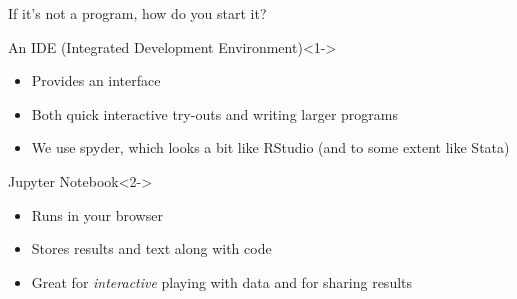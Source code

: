 \documentclass{beamer}
\begin{document}
\begin{frame}{If it's not a program, how do you start it?}
	\begin{block}{An IDE (Integrated Development Environment)}<1->
		\begin{itemize}
			\item Provides an interface
			\item Both quick interactive try-outs and writing larger programs
			\item We use spyder, which looks a bit like RStudio (and to some extent like Stata)
		\end{itemize}
	\end{block}
	
	
	\begin{block}{Jupyter Notebook}<2->
		\begin{itemize}
			\item Runs in your browser
			\item Stores results and text along with code
			\item Great for \emph{interactive} playing with data and for sharing results
		\end{itemize}
	\end{block}
	
\end{frame}
\end{document}
